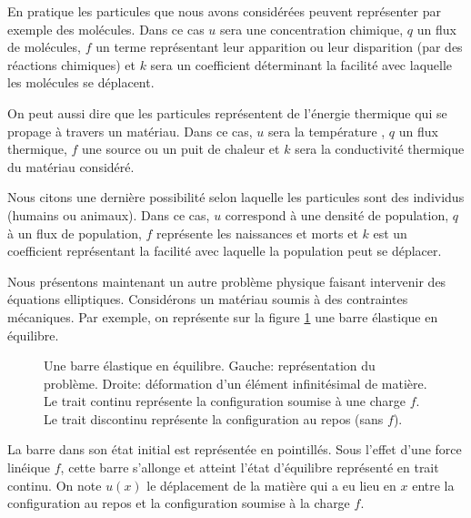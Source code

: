 \documentclass[12pt,a4paper,twoside]{article}
\begin{document}
En pratique les particules que nous avons consid\'er\'ees peuvent 
repr\'esenter par exemple des mol\'ecules.
Dans ce cas $u$ sera une concentration chimique, $q$ un flux de mol\'ecules, 
$f$ un terme repr\'esentant leur apparition ou leur disparition
(par des r\'eactions chimiques) et
$k$ sera un coefficient d\'eterminant la facilit\'e avec laquelle
les mol\'ecules se d\'eplacent.

On peut aussi dire que les particules repr\'esentent de l'\'energie thermique
qui se propage \`a travers un mat\'eriau.
Dans ce cas, $u$ sera la temp\'erature , $q$ un flux thermique, $f$ une source
ou un puit de chaleur et $k$ sera la conductivit\'e thermique du mat\'eriau consid\'er\'e.

Nous citons une derni\`ere possibilit\'e selon laquelle les particules sont des
individus (humains ou animaux).
Dans ce cas, $u$ correspond \`a une densit\'e de population,
$q$ \`a un flux de population, $f$ repr\'esente les naissances et morts
et $k$ est un coefficient repr\'esentant la
facilit\'e avec laquelle la population peut se d\'eplacer. 


Nous pr\'esentons maintenant
un autre probl\`eme physique faisant intervenir des \'equations elliptiques.
Consid\'erons un mat\'eriau 
soumis \`a des contraintes m\'ecaniques.
Par exemple, on repr\'esente sur la figure \ref{fig:barre} une barre \'elastique
en \'equilibre.


\begin{figure}
\begin{tikzpicture}[scale = 1.5]
  
\end{tikzpicture}
\begin{tikzpicture}[scale = 2]
  
\end{tikzpicture}
\caption{Une barre \'elastique en \'equilibre. Gauche: repr\'esentation du probl\`eme.
  Droite: d\'eformation d'un \'el\'ement infinit\'esimal de mati\`ere.
  Le trait continu repr\'esente la configuration soumise \`a une charge $f$.
  Le trait discontinu repr\'esente la configuration au repos (sans $f$).}
\label{fig:barre}
\end{figure}


La barre dans son \'etat initial est repr\'esent\'ee en pointill\'es.
Sous l'effet d'une force lin\'eique $f$, cette barre s'allonge
et atteint l'\'etat d'\'equilibre repr\'esent\'e en trait continu.
On note $u(x)$ le d\'eplacement de la mati\`ere qui a eu lieu en $x$ entre
la configuration au repos et la configuration soumise \`a la charge $f$.
\end{document}
